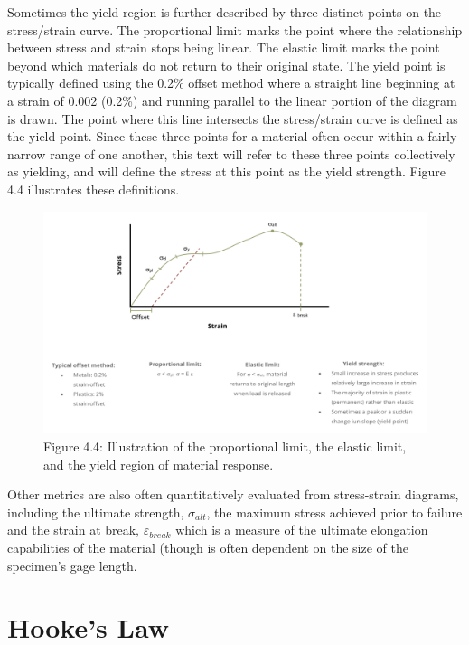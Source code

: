 \documentclass[
  letterpaper,
  DIV=11,
  numbers=noendperiod]{scrreprt}
\begin{document}
Sometimes the yield region is further described by three distinct points
on the stress/strain curve. The proportional limit marks the point where
the relationship between stress and strain stops being linear. The
elastic limit marks the point beyond which materials do not return to
their original state. The yield point is typically defined using the
0.2\% offset method where a straight line beginning at a strain of 0.002
(0.2\%) and running parallel to the linear portion of the diagram is
drawn. The point where this line intersects the stress/strain curve is
defined as the yield point. Since these three points for a material
often occur within a fairly narrow range of one another, this text will
refer to these three points collectively as yielding, and will define
the stress at this point as the yield strength. Figure 4.4 illustrates
these definitions.

\begin{figure}[H]

{\centering \includegraphics{images/CH4 PNGs/4.4.png}

}

\caption{Figure 4.4: Illustration of the proportional limit, the elastic
limit, and the yield region of material response.}

\end{figure}%

Other metrics are also often quantitatively evaluated from stress-strain
diagrams, including the ultimate strength, \(\sigma_{alt}\), the maximum
stress achieved prior to failure and the strain at break,
\(\varepsilon_{break}\) which is a measure of the ultimate elongation
capabilities of the material (though is often dependent on the size of
the specimen's gage length.

\section{Hooke's Law}\label{sec-4.3}
\end{document}
